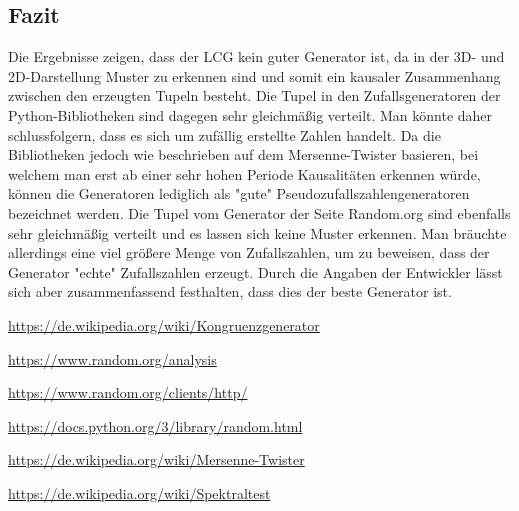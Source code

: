 \documentclass[12pt]{article}
\begin{document}
    \subsection{Fazit}\label{subsec:fazit}
    Die Ergebnisse zeigen, dass der LCG kein guter Generator ist, da in der 3D- und 2D-Darstellung Muster zu erkennen sind und somit ein kausaler Zusammenhang zwischen den erzeugten Tupeln besteht.
    Die Tupel in den Zufallsgeneratoren der Python-Bibliotheken sind dagegen sehr gleichmäßig verteilt.
    Man könnte daher schlussfolgern, dass es sich um zufällig erstellte Zahlen handelt.
    Da die Bibliotheken jedoch wie beschrieben auf dem Mersenne-Twister basieren, bei welchem man erst ab einer sehr hohen Periode Kausalitäten erkennen würde,
    können die Generatoren lediglich als "gute" Pseudozufallszahlengeneratoren bezeichnet werden.
    Die Tupel vom Generator der Seite Random.org sind ebenfalls sehr gleichmäßig verteilt und es lassen sich keine Muster erkennen.
    Man bräuchte allerdings eine viel größere Menge von Zufallszahlen, um zu beweisen, dass der Generator "echte" Zufallszahlen erzeugt.
    Durch die Angaben der Entwickler lässt sich aber zusammenfassend festhalten, dass dies der beste Generator ist.


    \vfill

    \begin{thebibliography}{12345}

        \url{https://de.wikipedia.org/wiki/Kongruenzgenerator}

        \url{https://www.random.org/analysis}

        \url{https://www.random.org/clients/http/}

        \url{https://docs.python.org/3/library/random.html}

        \url{https://de.wikipedia.org/wiki/Mersenne-Twister}

        \url{https://de.wikipedia.org/wiki/Spektraltest}

    \end{thebibliography}
\end{document}
